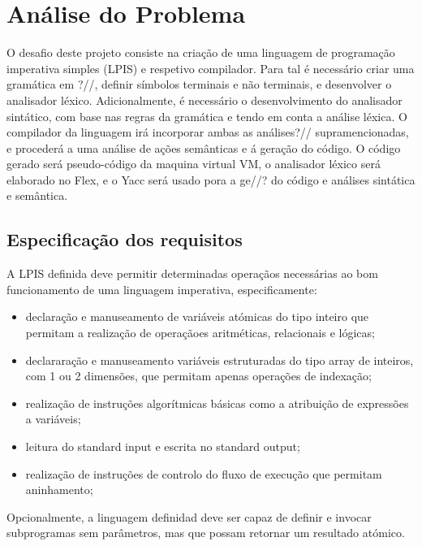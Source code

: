\chapter{Análise do Problema}
\label{cap:analise}

O desafio deste projeto consiste na criação de uma linguagem de programação imperativa simples (LPIS) e respetivo compilador.
Para tal é necessário criar uma gramática em ?//, definir símbolos terminais e não terminais, e desenvolver o analisador léxico. Adicionalmente, é necessário o desenvolvimento do analisador sintático, com base nas regras da gramática e tendo em conta a análise léxica. O compilador da linguagem irá incorporar ambas as análises?// supramencionadas, e procederá a uma análise de ações semânticas e á geração do código. 
O código gerado será pseudo-código da maquina virtual VM, o analisador léxico será elaborado no Flex, e o Yacc será usado pora a ge//? do código e análises sintática e semântica.   


\section{Especificação dos requisitos}
\label{sec:especificacao:analise}

A LPIS definida deve permitir determinadas operaçãos necessárias ao bom funcionamento de uma linguagem imperativa, especificamente:

\begin{itemize}
\item declaração e manuseamento de variáveis atómicas do tipo inteiro que permitam a realização de operaçãoes aritméticas, relacionais e lógicas;
\item declararação e manuseamento variáveis estruturadas do tipo array de inteiros, com 1 ou 2 dimensões, que permitam apenas operações de indexação;
\item realização de instruções algorítmicas básicas como a atribuição de expressões a variáveis;
\item leitura do standard input e escrita no standard output;
\item realização de instruções de controlo do fluxo de execução que permitam aninhamento;
\end{itemize}

Opcionalmente, a linguagem definidad deve ser capaz de definir e invocar subprogramas sem parâmetros, mas que possam retornar um resultado atómico.

\newpage

